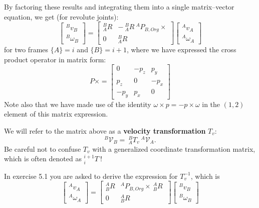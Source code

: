 \documentclass[]{article}
\begin{document}
By factoring these results and integrating them into a single matrix--vector equation, we get (for revolute joints):
\begin{displaymath}
\left[\begin{array}{c}^{B}v_{B} \\ ^{B}\omega_{B}\end{array}\right] = \left[\begin{array}{cc}^{B}_{A}R & -\ \!^{B}_{A}R\ \!^{A}P_{B,Org}\!\times \\ 0 & ^{B}_{A}R\end{array}\right]\left[\begin{array}{c}^{A}v_{A} \\ ^{A}\omega_{A}\end{array}\right]
\end{displaymath}
for two frames $\{A\}=i$ and $\{B\}=i+1$, where we have expressed the cross product operator in matrix form:
\begin{displaymath}
P\!\times = \left[\begin{array}{ccc} 0 & -p_{z} & p_{y} \\ p_{z} & 0 & -p_{x} \\ -p_{y} & p_{x} & 0 \end{array}\right]
\end{displaymath}
Note also that we have made use of the identity $\omega \times p = -p \times \omega$ in the $(1,2)$ element of this matrix expression.

We will refer to the matrix above as a \textbf{velocity transformation} $T_{v}$:
\begin{displaymath}
^{B}\mathcal{V}_{B} = \ \!^{B}_{A}T_{v}\ \!^{A}\mathcal{V}_{A}.
\end{displaymath}
 Be careful not to confuse $T_{v}$ with a generalized coordinate transformation matrix, which is often denoted as $^{i+1}_{i}T\ $!

In exercise 5.1 you are asked to derive the expression for $T_{v}^{-1}$, which is
\begin{displaymath}
\left[\begin{array}{c}^{A}v_{A} \\ ^{A}\omega_{A}\end{array}\right] = \left[\begin{array}{cc}^{A}_{B}R & ^{A}P_{B,Org}\!\times\ \!^{A}_{B}R\ \\ 0 & ^{A}_{B}R\end{array}\right]\left[\begin{array}{c}^{B}v_{B} \\ ^{B}\omega_{B}\end{array}\right]
\end{displaymath}
\end{document}
